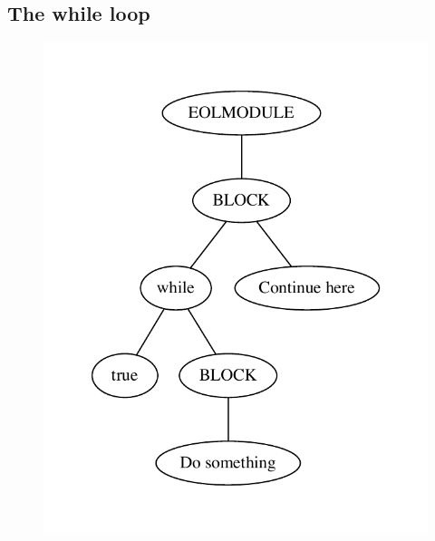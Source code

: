 \subsection{The while loop}

\begin{figure}
\centering
\begin{minipage}{.3\textwidth}
  \centering
  
  \caption{}
  \label{lst:whileBranch}
\end{minipage}%
\begin{minipage}{.3\textwidth}
  \centering
  \includegraphics[width=\linewidth]{figures/statements/while_AST.pdf}
    \caption{}
  \label{fig:whileAST}
\end{minipage}
\begin{minipage}{.3\textwidth}
  \centering

\end{minipage}
\end{figure}
